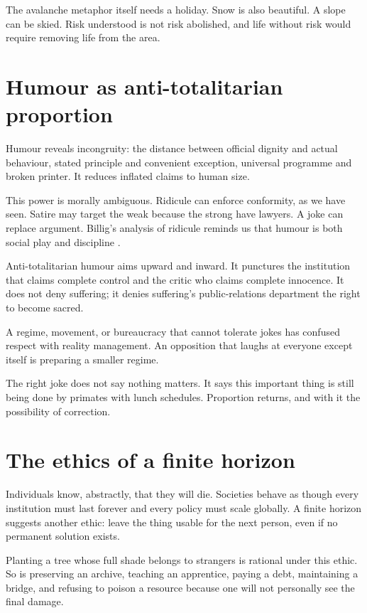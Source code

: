 \documentclass[12pt,a4paper]{book}
\begin{document}
The avalanche metaphor itself needs a holiday.  Snow is also beautiful.  A
slope can be skied.  Risk understood is not risk abolished, and life without
risk would require removing life from the area.

\section{Humour as anti-totalitarian proportion}

Humour reveals incongruity: the distance between official dignity and actual
behaviour, stated principle and convenient exception, universal programme and
broken printer.  It reduces inflated claims to human size.

This power is morally ambiguous.  Ridicule can enforce conformity, as we have
seen.  Satire may target the weak because the strong have lawyers.  A joke can
replace argument.  Billig's analysis of ridicule reminds us that humour is both
social play and discipline \cite{billig2005}.

Anti-totalitarian humour aims upward and inward.  It punctures the institution
that claims complete control and the critic who claims complete innocence.  It
does not deny suffering; it denies suffering's public-relations department the
right to become sacred.

A regime, movement, or bureaucracy that cannot tolerate jokes has confused
respect with reality management.  An opposition that laughs at everyone except
itself is preparing a smaller regime.

The right joke does not say nothing matters.  It says this important thing is
still being done by primates with lunch schedules.  Proportion returns, and
with it the possibility of correction.

\section{The ethics of a finite horizon}

Individuals know, abstractly, that they will die.  Societies behave as though
every institution must last forever and every policy must scale globally.  A
finite horizon suggests another ethic: leave the thing usable for the next
person, even if no permanent solution exists.

Planting a tree whose full shade belongs to strangers is rational under this
ethic.  So is preserving an archive, teaching an apprentice, paying a debt,
maintaining a bridge, and refusing to poison a resource because one will not
personally see the final damage.
\end{document}
